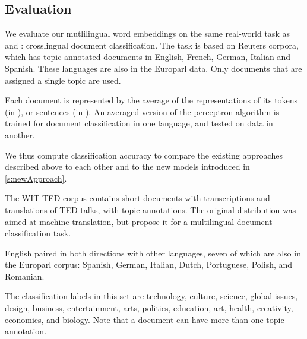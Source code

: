 

\subsection{Evaluation}
We evaluate our mutlilingual word embeddings on the same real-world task as \cite{klementiev2012inducing} and \cite{hermann2013multilingual}: crosslingual document classification. The task is based on Reuters corpora, which has topic-annotated documents in English, French, German, Italian and Spanish. These languages are also in the Europarl data. Only documents that are assigned a single topic are used.

Each document is represented by the average of the representations of its tokens (in \cite{klementiev2012inducing}), or sentences (in \cite{hermann2013multilingual}).
An averaged version of the perceptron algorithm is trained for document classification in one language, and tested on data in another.

We thus compute classification accuracy to compare the existing approaches described above to each other and to the new models introduced in \ref{s:newApproach}.






The WIT TED corpus \cite{cettolo2012} contains short documents with transcriptions and translations of TED talks, with topic annotations. The original distribution was aimed at machine translation, but \cite{hermann2014multilingual} propose it for a multilingual document classification task.


English paired in both directions with other languages, seven of which are also in the Europarl corpus: Spanish, German, Italian, Dutch, Portuguese, Polish, and Romanian.

The classification labels in this set are technology, culture, science, global issues, design, business, entertainment, arts, politics, education, art, health, creativity, economics, and biology. Note that a document can have more than one topic annotation. 







